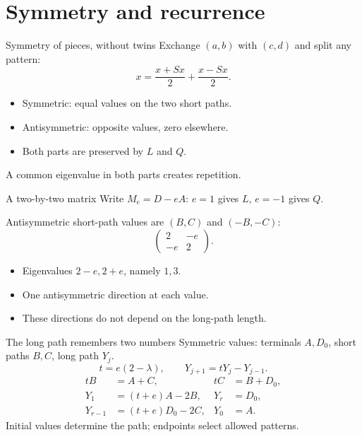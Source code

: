 \documentclass{beamer}
\begin{document}
\section{Symmetry and recurrence}
\begin{frame}{Symmetry of pieces, without twins}
Exchange $(a,b)$ with $(c,d)$ and split any pattern:
\[
x=\frac{x+Sx}{2}+\frac{x-Sx}{2}.
\]
\begin{itemize}
\item Symmetric: equal values on the two short paths.
\item Antisymmetric: opposite values, zero elsewhere.
\item Both parts are preserved by $L$ and $Q$.
\end{itemize}
A common eigenvalue in both parts creates repetition.
\end{frame}
\begin{frame}{A two-by-two matrix}
Write $M_e=D-eA$: $e=1$ gives $L$, $e=-1$ gives $Q$.

Antisymmetric short-path values are $(B,C)$ and $(-B,-C)$:
\[
\begin{pmatrix}2&-e\\-e&2\end{pmatrix}.
\]
\begin{itemize}
\item Eigenvalues $2-e,2+e$, namely $1,3$.
\item One antisymmetric direction at each value.
\item These directions do not depend on the long-path length.
\end{itemize}
\end{frame}
\begin{frame}{The long path remembers two numbers}
Symmetric values: terminals $A,D_0$, short paths $B,C$, long path $Y_j$.
\[
t=e(2-\lambda),\qquad Y_{j+1}=tY_j-Y_{j-1}.
\]
\[
\begin{aligned}
tB&=A+C,&tC&=B+D_0,\\
Y_1&=(t+e)A-2B,&Y_r&=D_0,\\
Y_{r-1}&=(t+e)D_0-2C,&Y_0&=A.
\end{aligned}
\]
Initial values determine the path; endpoints select allowed patterns.
\end{frame}
\end{document}
